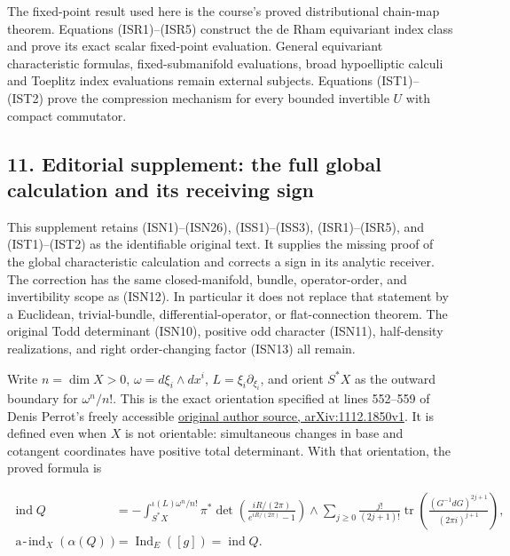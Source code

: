 \documentclass[
  11pt,
]{article}
\begin{document}
The fixed-point result used here is the course's proved distributional
chain-map theorem. Equations (ISR1)--(ISR5) construct the de Rham
equivariant index class and prove its exact scalar fixed-point
evaluation. General equivariant characteristic formulas,
fixed-submanifold evaluations, broad hypoelliptic calculi and Toeplitz
index evaluations remain external subjects. Equations (IST1)--(IST2)
prove the compression mechanism for every bounded invertible \(U\) with
compact commutator.

\subsection{11. Editorial supplement: the full global calculation and
its receiving
sign}\label{editorial-supplement-the-full-global-calculation-and-its-receiving-sign}

This supplement retains (ISN1)--(ISN26), (ISS1)--(ISS3), (ISR1)--(ISR5),
and (IST1)--(IST2) as the identifiable original text. It supplies the
missing proof of the global characteristic calculation and corrects a
sign in its analytic receiver. The correction has the same
closed-manifold, bundle, operator-order, and invertibility scope as
(ISN12). In particular it does not replace that statement by a
Euclidean, trivial-bundle, differential-operator, or flat-connection
theorem. The original Todd determinant (ISN10), positive odd character
(ISN11), half-density realizations, and right order-changing factor
(ISN13) all remain.

Write \(n=\dim X>0\), \(\omega=d\xi_i\wedge dx^i\),
\(L=\xi_i\partial_{\xi_i}\), and orient \(S^*X\) as the outward boundary
for \(\omega^n/n!\). This is the exact orientation specified at lines
552--559 of Denis Perrot's freely accessible
\href{https://arxiv.org/abs/1112.1850v1}{original author source,
arXiv:1112.1850v1}. It is defined even when \(X\) is not orientable:
simultaneous changes in base and cotangent coordinates have positive
total determinant. With that orientation, the proved formula is

\[
\begin{split}
 \operatorname{ind}Q
 &=-\int_{S^*X}^{\iota(L)\omega^n/n!}
       \pi^*\det\!\left(\frac{iR/(2\pi)}{e^{iR/(2\pi)}-1}\right)
       \wedge
       \sum_{j\geq0}\frac{j!}{(2j+1)!}
         \operatorname{tr}\!\left(
              \frac{(G^{-1}dG)^{2j+1}}{(2\pi i)^{j+1}}\right),\\
 \operatorname{a\!-\!ind}_X(\alpha(Q))
 &=\operatorname{Ind}_E([g])=\operatorname{ind}Q.
\end{split}
\tag{IG1}
\]
\end{document}
